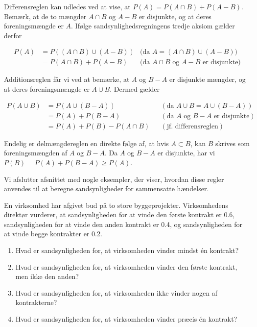 Differensreglen kan udledes ved at vise, at $P(A)=P(A \cap B)+P(A-B)$. Bemærk, at de to mængder $A \cap B$ og $A-B$ er disjunkte, og at deres foreningsmængde er $A$. Ifølge sandsynlighedsregningens tredje aksiom gælder derfor

\begin{align*}
    P(A) &= P\left((A \cap B) \cup (A - B)\right) & \text{(da } A = (A \cap B) \cup (A - B)) \\
         &= P(A \cap B) + P(A - B) & \text{(da } A \cap B \text{ og } A - B \text{ er disjunkte)}
    \end{align*}
    

Additionsreglen får vi ved at bemærke, at $A$ og $B-A$ er disjunkte mængder, og at deres foreningsmængde er $A \cup B$. Dermed gælder

\begin{align*}
    P(A \cup B) &= P(A \cup (B - A)) && (\text{da } A \cup B = A \cup (B - A)) \\
                &= P(A) + P(B - A) && (\text{da } A \text{ og } B - A \text{ er disjunkte}) \\
                &= P(A) + P(B) - P(A \cap B) && (\text{jf. differensreglen})
    \end{align*}
    
Endelig er delmængdereglen en direkte følge af, at hvis $A \subset B$, kan $B$ skrives som foreningsmængden af $A$ og $B-A$. Da $A$ og $B-A$ er disjunkte, har vi $P(B)=P(A)+P(B-A) \geq P(A)$.

Vi afslutter afsnittet med nogle eksempler, der viser, hvordan disse regler anvendes til at beregne sandsynligheder for sammensatte hændelser.

\begin{example}
    En virksomhed har afgivet bud på to store byggeprojekter. Virksomhedens direktør vurderer, at sandsynligheden for at vinde den første kontrakt er 0.6, sandsynligheden for at vinde den anden kontrakt er 0.4, og sandsynligheden for at vinde begge kontrakter er 0.2.

    \begin{enumerate}[label=(\alph*)]
        \item Hvad er sandsynligheden for, at virksomheden vinder mindst én kontrakt?
        \item Hvad er sandsynligheden for, at virksomheden vinder den første kontrakt, men ikke den anden?
        \item Hvad er sandsynligheden for, at virksomheden ikke vinder nogen af kontrakterne?
        \item Hvad er sandsynligheden for, at virksomheden vinder præcis én kontrakt?
    \end{enumerate}
\end{example}

